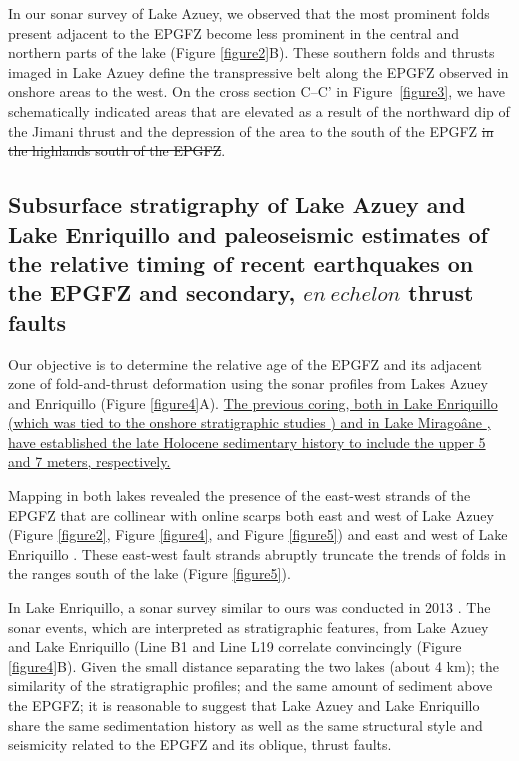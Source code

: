 \documentclass[linenumbers,draft]{agujournal}
\begin{document}
In our sonar survey of Lake Azuey, we observed that the most prominent folds present adjacent to the EPGFZ become less prominent in the central and northern parts of the lake (Figure \ref{figure2}B). These southern folds and thrusts imaged in Lake Azuey define the transpressive belt along the EPGFZ observed in onshore areas to the west. On the cross section C--C' in Figure~\ref{figure3}, we have schematically indicated areas that are elevated as a result of the northward dip of the Jimani thrust and the depression of the area to the south of the EPGFZ\st{ in the highlands south of the EPGFZ}.

\subsection{Subsurface stratigraphy of Lake Azuey and Lake Enriquillo and paleoseismic estimates of the relative timing of recent earthquakes on the EPGFZ and secondary, $en~echelon$ thrust faults}
Our objective is to determine the relative age of the EPGFZ and its adjacent zone of fold-and-thrust deformation using the sonar profiles from Lakes Azuey and Enriquillo (Figure \ref{figure4}A). \ul{The previous coring, both in Lake Enriquillo} \underline{\citep{rios2013holocene}}\ul{ (which was tied to the onshore stratigraphic studies}\underline{ \citep{taylor1985stratigraphy,rios2013holocene})}\ul{ and in Lake Mirago\^ane}\underline{ \citep{higuera199910},}\ul{ have established the late Holocene sedimentary history to include the upper 5 and 7 meters, respectively.}

Mapping in both lakes revealed the presence of the east-west strands of the EPGFZ that are collinear with online scarps both east and west of Lake Azuey (Figure \ref{figure2}, Figure \ref{figure4}, and Figure \ref{figure5}) and east and west of Lake Enriquillo \citep{mann1995actively,rios2013holocene}. These east-west fault strands abruptly truncate the trends of folds in the ranges south of the lake (Figure \ref{figure5}). 

In Lake Enriquillo, a sonar survey similar to ours was conducted in 2013 \citep{rios2013holocene}. The sonar events, which are interpreted as stratigraphic features, from Lake Azuey and Lake Enriquillo (Line B1 and Line L19 correlate convincingly (Figure \ref{figure4}B). Given the small distance separating the two lakes (about 4 km); the similarity of the stratigraphic profiles; and the same amount of sediment above the EPGFZ; it is reasonable to suggest that Lake Azuey and Lake Enriquillo share the same sedimentation history as well as the same structural style and seismicity related to the EPGFZ and its oblique, thrust faults.
\end{document}
